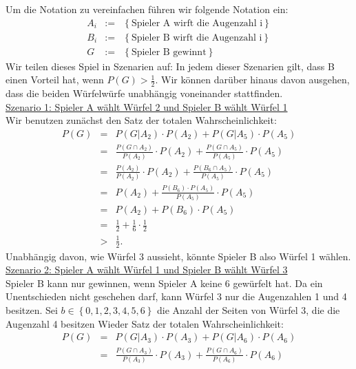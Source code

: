 \begin{Answer}
	Um die Notation zu vereinfachen führen wir folgende Notation ein:
	\begin{eqnarray*}
		A_i&:=&\left\lbrace \text{Spieler A wirft die Augenzahl i}\right\rbrace\\
		B_i&:=&\left\lbrace \text{Spieler B wirft die Augenzahl i}\right\rbrace\\
		G&:=& \left\lbrace\text{Spieler B gewinnt}\right\rbrace
	\end{eqnarray*}
	Wir teilen dieses Spiel in Szenarien auf: In jedem dieser Szenarien gilt, dass B einen Vorteil hat, wenn $P(G)>\frac{1}{2}$. Wir können darüber hinaus davon ausgehen, dass die beiden Würfelwürfe unabhängig voneinander stattfinden.\\
		\underline{Szenario 1: Spieler A wählt Würfel 2 und Spieler B wählt Würfel 1}\\		
		Wir benutzen zunächst den Satz der totalen Wahrscheinlichkeit:
		\begin{eqnarray*}
			P(G)&=&P(G\vert A_2)\cdot P(A_2)+P(G\vert A_5)\cdot P(A_5)\\
			&=&\frac{P(G\cap A_2)}{P(A_2)}\cdot P(A_2)+\frac{P(G\cap A_5)}{P(A_5)}\cdot P(A_5)\\
			&=&\frac{P( A_2)}{P(A_2)}\cdot P(A_2)+\frac{P(B_6\cap A_5)}{P(A_5)}\cdot P(A_5)\\
			&=&P(A_2)+\frac{P(B_6)\cdot P(A_5)}{P(A_5)}\cdot P(A_5)\\
			&=&P(A_2)+P(B_6)\cdot P(A_5)\\
			&=& \frac{1}{2}+\frac{1}{6}\cdot \frac{1}{2}\\
			&>& \frac{1}{2}.
		\end{eqnarray*}
		Unabhängig davon, wie Würfel 3 aussieht, könnte Spieler B also Würfel 1 wählen.\\
		\underline{Szenario 2: Spieler A wählt Würfel 1 und Spieler B wählt Würfel 3}\\
		Spieler B kann nur gewinnen, wenn Spieler A keine 6 gewürfelt hat. Da ein Unentschieden nicht geschehen darf, kann Würfel 3 nur die Augenzahlen 1 und 4 besitzen. Sei $b\in\left\lbrace 0,1,2,3,4,5,6\right\rbrace$ die Anzahl der Seiten von Würfel 3, die die Augenzahl 4 besitzen
			Wieder Satz der totalen Wahrscheinlichkeit:
			\begin{eqnarray*}
				P(G)&=&P(G\vert A_3)\cdot P(A_3)+P(G\vert A_6)\cdot P(A_6)\\
				&=&\frac{P(G\cap A_3)}{P(A_3)}\cdot P(A_3)+\frac{P(G\cap A_6)}{P(A_6)}\cdot P(A_6)\\

\end{eqnarray*}
\end{Answer}
